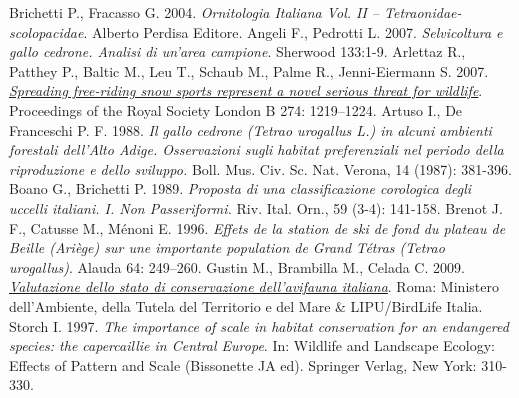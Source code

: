 \documentclass[10pt,twoside,openany,x11names,svgnames,italian,a5paper,dvipsnames,table]{memoir}
\newcommand{\backgroundrectanglecolor}{G8!80!white}
\begin{document}
\begin{thebibliography}{99}
Brichetti P., Fracasso G. 2004. \emph{Ornitologia Italiana Vol. II – \emph{Tetraonidae-scolopacidae}}. Alberto Perdisa Editore.
Angeli F., Pedrotti L. 2007. \emph{Selvicoltura e gallo cedrone. Analisi di un’area campione}. Sherwood 133:1-9.
Arlettaz R., Patthey P., Baltic M., Leu T., Schaub M., Palme R., Jenni-Eiermann S. 2007. \href{http://rspb.royalsocietypublishing.org/content/274/1614/1219.full.pdf}{\emph{Spreading free-riding snow sports represent a novel serious threat for wildlife}}. Proceedings of the Royal Society London B 274: 1219–1224.
Artuso I., De Franceschi P. F. 1988. \emph{Il gallo cedrone (\emph{Tetrao urogallus} L.) in alcuni ambienti forestali dell’Alto Adige. Osservazioni sugli habitat preferenziali nel periodo della riproduzione e dello sviluppo.} Boll. Mus. Civ. Sc. Nat. Verona, 14 (1987): 381-396.
Boano G., Brichetti P. 1989. \emph{Proposta di una classificazione corologica degli uccelli italiani. I. Non Passeriformi.} Riv. Ital. Orn., 59 (3-4): 141-158. 
Brenot J. F., Catusse M., Ménoni E. 1996. \emph{Effets de la station de ski de fond du plateau de Beille (Ariège) sur une importante population de Grand Tétras (\emph{Tetrao urogallus})}. Alauda 64: 249–260.
Gustin M., Brambilla M., Celada C. 2009. \href{http://www.uccellidaproteggere.it/content/download/4210/46448/file/valutazione_avifauna_italiana_volumeI.pdf}{\emph{Valutazione dello stato di conservazione dell’avifauna italiana}}. Roma: Ministero dell’Ambiente, della Tutela del Territorio e del Mare \& LIPU/BirdLife Italia.
Storch I. 1997. \emph{The importance of scale in habitat conservation for an endangered species: the capercaillie in Central Europe}. In: Wildlife and Landscape Ecology: Effects of Pattern and Scale (Bissonette JA ed). Springer Verlag, New York: 310-330.
\end{thebibliography}

\makeatletter
\renewcommand\@biblabel[1]{\textcolor{\backgroundrectanglecolor}{$\bullet$}}
\makeatother
\end{document}
